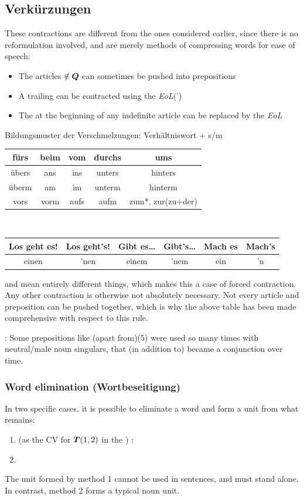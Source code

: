 \subsection[Contractions]{Verkürzungen}
These contractions are different from the ones considered earlier, since there is no reformulation  involved, and are merely methods of compressing  words  for ease of speech:
\begin{itemize}
\item The articles   $\notin\boldsymbol{Q}$ can sometimes be pushed into prepositions
\item A trailing  can be contracted using  the \textit{EoL}(')
\item The  at the beginning of any indefinite article can be replaced by the \textit{EoL}
\end{itemize}
\begin{setdef}
    Bildungsmuster der Verschmelzungen: Verhältniswort + s/m\\
    \begin{tabular}{c|c|c|c|c}
        \hline fürs & beim & vom & durchs & ums\\\hline\hline übers & ans & ins & unters & hinters\\\hline überm & am & im & unterm & hinterm\\\hline
        vors & vorm & aufs & aufm & zum*, zur(zu+der)\\\hline
    \end{tabular}\\\begin{tabular}{cc|cc|cc}
        \hline Los geht es! & Los geht's! & Gibt es\ldots & Gibt's\ldots & Mach es & Mach's\\\hline
        einen & 'nen & einem & 'nem & ein & 'n
    \end{tabular}
\end{setdef}
 and  mean entirely different things, which makes this a case of forced contraction. Any other contraction is otherwise not absolutely necessary.
Not every article and preposition can be pushed together, which is why  the above table has been made comprehensive with respect to this rule.

: Some prepositions like (apart from)($5$) were used so many times with neutral/male noun singulars, that (in addition to) became a conjunction over time.
\subsubsection{Word elimination (Wortbeseitigung)}
In two specific cases, it is possible to eliminate a word and form a  unit from what remains:
\begin{enumerate}
    \item {} (as the CV for $\boldsymbol{T}(1,2)$ in the ) : 
    \item {}
\end{enumerate}
The unit formed by method 1 cannot be used in sentences, and must stand alone. In contrast, method 2 forms a typical noun unit.
